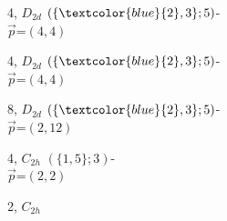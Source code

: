 \documentclass{beamer}
\begin{document}
\begin{frame}
\begin{center}
\begin{minipage}{19mm}\centering
{}\par
4, $D_{2d}$
$(\{\textcolor{blue}{2}, 3\};5)$-\\
$\vec{p}$=$(4,4)$
\end{minipage}
\begin{minipage}{19mm}\centering
{}\par
4, $D_{2d}$
$(\{\textcolor{blue}{2}, 3\};5)$-\\
$\vec{p}$=$(4,4)$
\end{minipage}
\begin{minipage}{19mm}\centering
{}\par
8, $D_{2d}$
$(\{\textcolor{blue}{2}, 3\};5)$-\\
$\vec{p}$=$(2,12)$
\end{minipage}
\begin{minipage}{19mm}\centering
{}\par
4, $C_{2h}$
$(\{1, 5\};3)$-\\
$\vec{p}$=$(2,2)$
\end{minipage}
\hspace{8mm}
\begin{minipage}{19mm}\centering
{}\par
2, $C_{2h}$

\end{minipage}
\end{center}
\end{frame}
\end{document}
